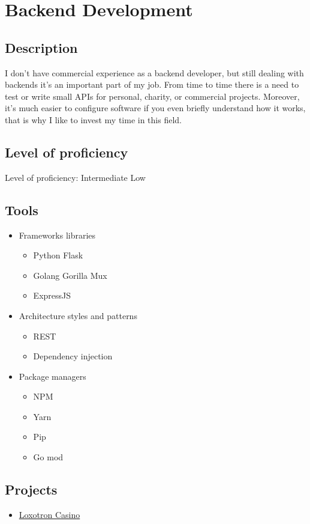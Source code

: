 \section{Backend Development}

\subsection{Description}

I don't have commercial experience as a backend developer,
but still dealing with backends it's an important part of my job.
From time to time there is a need to test or write small APIs for personal,
charity, or commercial projects. Moreover, it's much easier to configure software
if you even briefly understand how it works, that is why I like to invest my time in this field.

\subsection{Level of proficiency}

Level of proficiency: Intermediate Low

\subsection{Tools}
\begin{itemize}
    \item Frameworks libraries
    \begin{itemize}
        \item Python Flask
        \item Golang Gorilla Mux
        \item ExpressJS
    \end{itemize}

    \item Architecture styles and patterns
    \begin{itemize}
        \item REST
        \item Dependency injection
    \end{itemize}

    \item Package managers
    \begin{itemize}
        \item NPM
        \item Yarn
        \item Pip
        \item Go mod
    \end{itemize}
\end{itemize}

\subsection{Projects}

\begin{itemize}
    \item \hyperlink{proj_loxotron}{Loxotron Casino}
\end{itemize}

\newpage
